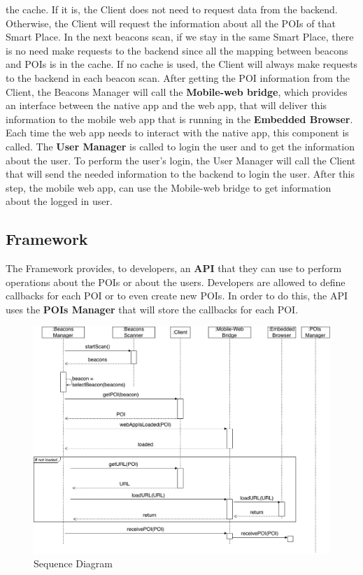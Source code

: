 the cache. If it is, the Client does not need to request
data from the backend. Otherwise, the Client will
request the information about all the POIs of that
Smart Place. In the next beacons scan, if we stay in
the same Smart Place, there is no need make requests
to the backend since all the mapping between beacons
and POIs is in the cache.
If no cache is used, the Client will always make requests
to the backend in each beacon scan.
After getting the POI information from the Client,
the Beacons Manager will call the \textbf{Mobile-web bridge},
which provides an interface between the native app
and the web app, that will deliver this information
to the mobile web app that is running in the
\textbf{Embedded Browser}. 
Each time the web app needs to interact
with the native app, this component is called.
The \textbf{User Manager} is called to login the
user and to get the information about the user. 
To perform the user's login, the User Manager
will call the Client that will send the needed information
to the backend to login the user. After this step,
the mobile web app, can use the Mobile-web bridge
to get information about the logged in user.

\subsection{Framework}
\label{sub:framework}
The Framework provides, to developers, an \textbf{API} that they
can use to perform operations about the POIs or about the users.
Developers are allowed to define callbacks for each POI or to
even create new POIs. In order to do this, the API
uses the \textbf{POIs Manager} that will store the callbacks
for each POI.

\begin{figure}[!ht]
  \centering
    \includegraphics[width=1\textwidth]{img/smart-places-sequence}
    \caption{Sequence Diagram}
    \label{fig:sequence}
\end{figure}

